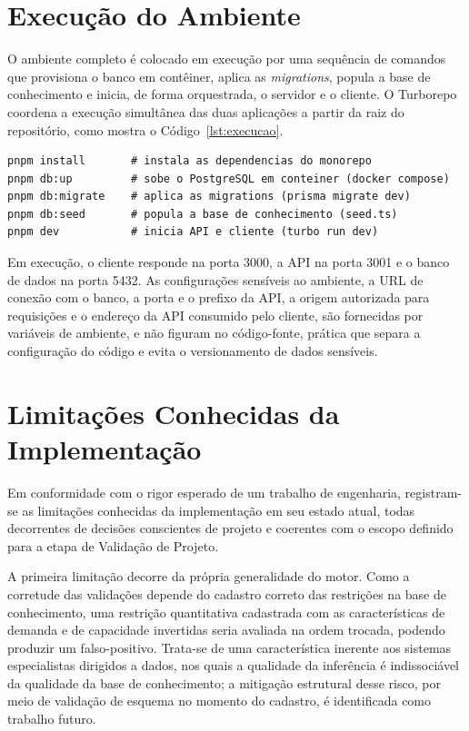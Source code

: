 \section{Execução do Ambiente}
\label{sec:impl-execucao}

O ambiente completo é colocado em execução por uma sequência de comandos que provisiona o banco em contêiner, aplica as \textit{migrations}, popula a base de conhecimento e inicia, de forma orquestrada, o servidor e o cliente. O Turborepo coordena a execução simultânea das duas aplicações a partir da raiz do repositório, como mostra o Código~\ref{lst:execucao}.

\begin{lstlisting}[caption={Comandos de inicialização do ambiente de desenvolvimento},label={lst:execucao},basicstyle=\ttfamily\small]
pnpm install       # instala as dependencias do monorepo
pnpm db:up         # sobe o PostgreSQL em conteiner (docker compose)
pnpm db:migrate    # aplica as migrations (prisma migrate dev)
pnpm db:seed       # popula a base de conhecimento (seed.ts)
pnpm dev           # inicia API e cliente (turbo run dev)
\end{lstlisting}

Em execução, o cliente responde na porta 3000, a API na porta 3001 e o banco de dados na porta 5432. As configurações sensíveis ao ambiente, a URL de conexão com o banco, a porta e o prefixo da API, a origem autorizada para requisições e o endereço da API consumido pelo cliente, são fornecidas por variáveis de ambiente, e não figuram no código-fonte, prática que separa a configuração do código e evita o versionamento de dados sensíveis.

\section{Limitações Conhecidas da Implementação}
\label{sec:impl-limitacoes}

Em conformidade com o rigor esperado de um trabalho de engenharia, registram-se as limitações conhecidas da implementação em seu estado atual, todas decorrentes de decisões conscientes de projeto e coerentes com o escopo definido para a etapa de Validação de Projeto.

A primeira limitação decorre da própria generalidade do motor. Como a corretude das validações depende do cadastro correto das restrições na base de conhecimento, uma restrição quantitativa cadastrada com as características de demanda e de capacidade invertidas seria avaliada na ordem trocada, podendo produzir um falso-positivo. Trata-se de uma característica inerente aos sistemas especialistas dirigidos a dados, nos quais a qualidade da inferência é indissociável da qualidade da base de conhecimento\cite{Todd1992}; a mitigação estrutural desse risco, por meio de validação de esquema no momento do cadastro, é identificada como trabalho futuro.

